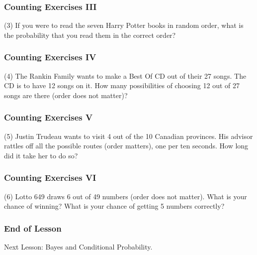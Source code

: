 \documentclass[xcolor=dvipsnames]{beamer}
\begin{document}
\begin{frame}
  \frametitle{Counting Exercises III}
(3) If you were to read the seven Harry Potter books in random order,
what is the probability that you read them in the correct order?
\end{frame}

\begin{frame}
  \frametitle{Counting Exercises IV}
(4) The Rankin Family wants to make a Best Of CD out of their 27
songs. The CD is to have 12 songs on it. How many possibilities of
choosing 12 out of 27 songs are there (order does not matter)?
\end{frame}

\begin{frame}
  \frametitle{Counting Exercises V}
(5) Justin Trudeau wants to visit 4 out of the 10 Canadian provinces.
His advisor rattles off all the possible routes (order matters), one
per ten seconds. How long did it take her to do so?
\end{frame}

\begin{frame}
  \frametitle{Counting Exercises VI}
(6) Lotto 649 draws 6 out of 49 numbers (order does not matter). What
is your chance of winning? What is your chance of getting 5 numbers
correctly?
\end{frame}

\begin{frame}
  \frametitle{End of Lesson}
Next Lesson: Bayes and Conditional Probability.
\end{frame}
\end{document}
